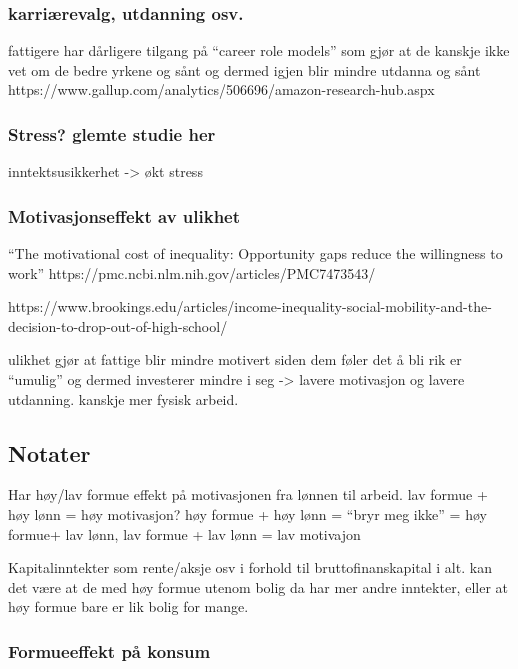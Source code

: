 \documentclass[
  12pt,
  a4paper,
  DIV=11,
  numbers=noendperiod]{scrartcl}
\begin{document}
\subsubsection{karriærevalg, utdanning
osv.}\label{karriuxe6revalg-utdanning-osv.}

fattigere har dårligere tilgang på ``career role models'' som gjør at de
kanskje ikke vet om de bedre yrkene og sånt og dermed igjen blir mindre
utdanna og sånt
https://www.gallup.com/analytics/506696/amazon-research-hub.aspx

\subsubsection{Stress? glemte studie
her}\label{stress-glemte-studie-her}

inntektsusikkerhet -\textgreater{} økt stress

\subsubsection{Motivasjonseffekt av
ulikhet}\label{motivasjonseffekt-av-ulikhet}

``The motivational cost of inequality: Opportunity gaps reduce the
willingness to work'' https://pmc.ncbi.nlm.nih.gov/articles/PMC7473543/

https://www.brookings.edu/articles/income-inequality-social-mobility-and-the-decision-to-drop-out-of-high-school/

ulikhet gjør at fattige blir mindre motivert siden dem føler det å bli
rik er ``umulig'' og dermed investerer mindre i seg -\textgreater{}
lavere motivasjon og lavere utdanning. kanskje mer fysisk arbeid.

\subsection{Notater}\label{notater-2}

Har høy/lav formue effekt på motivasjonen fra lønnen til arbeid. lav
formue + høy lønn = høy motivasjon? høy formue + høy lønn = ``bryr meg
ikke'' = høy formue+ lav lønn, lav formue + lav lønn = lav motivajon

Kapitalinntekter som rente/aksje osv i forhold til bruttofinanskapital i
alt. kan det være at de med høy formue utenom bolig da har mer andre
inntekter, eller at høy formue bare er lik bolig for mange.

\subsubsection{Formueeffekt på konsum}\label{formueeffekt-puxe5-konsum}
\end{document}
